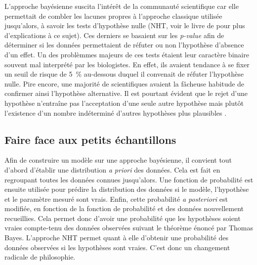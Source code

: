 \documentclass[11pt,twocolumn,twoside]{bopHomework}
\begin{document}
L'approche bayésienne suscita l'intérêt de la communauté scientifique car elle
permettait de combler les lacunes propres à l'approche classique utilisée
jusqu'alors, à savoir les tests d'hypothèse nulle (NHT, voir le livre de
\citet{fisher1925} pour plus d'explications à ce sujet).
Ces derniers se basaient sur les \textit{p-value} afin de déterminer si les
données permettaient de réfuter ou non l'hypothèse d'absence d'un effet.
Un des problèmmes majeurs de ces tests étaient leur caractère binaire souvent
mal interprété par les biologistes.
En effet, ils avaient tendance à se fixer un seuil de risque de 5~\% au-dessous
duquel il convenait de réfuter l'hypothèse nulle.
Pire encore, une majorité de scientifiques avaient la fâcheuse habitude de
confirmer ainsi l'hypothèse alternative.
Il est pourtant évident que le rejet d'une hypothèse n'entraîne pas
l'acceptation d'une seule autre hypothèse mais plutôt l'existence d'un nombre
indéterminé d'autres hypothèses plus plausibles \citep{garamszegi2009}.

\subsection{Faire face aux petits échantillons}

Afin de construire un modèle sur une approche bayésienne, il convient tout
d'abord d'établir une distribution \textit{a priori} des données.
Cela est fait en regroupant toutes les données connues jusqu'alors.
Une fonction de probabilité est ensuite utilisée pour prédire la distribution
des données si le modèle, l'hypothèse et le paramètre mesuré sont vrais.
Enfin, cette probabilité \textit{a posteriori} est modifiée, en fonction de la
fonction de probabilité et des données nouvellement recueillies.
Cela permet donc d'avoir une probabilité que les hypothèses soient vraies
compte-tenu des données observées suivant le théorème énoncé par Thomas Bayes.
L'approche NHT permet quant à elle d'obtenir une probabilité des données
observées si les hypothèses sont vraies.
C'est donc un changement radicale de philosophie.

\end{document}

